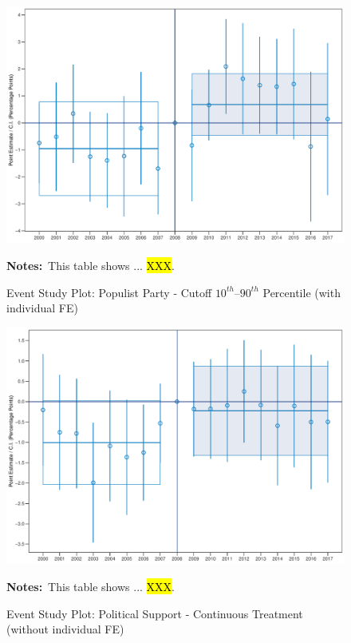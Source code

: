 \documentclass[11pt]{article}
\begin{document}
\begin{figure}[htbp!]
    \centering
    \caption{Event Study Plot: Populist Party - Cutoff $10^{th}$--$90^{th}$ Percentile (with individual FE)}\label{fig:dynamic_did_cbk_past_mean_pp_1090_ife}
    \includegraphics[width=1\linewidth]{events/dynamic_did_cbk_past_mean_pp_1090_ife}
    \begin{tablenotes}
        \footnotesize
        \item \textbf{Notes:}~This table shows ... \hl{XXX}.
    \end{tablenotes} 
\end{figure}

\begin{figure}[htbp!]
    \centering
    \caption{Event Study Plot: Political Support - Continuous Treatment (without individual FE)}\label{fig:dynamic_did_cbk_past_mean_ps_std_noife}
    \includegraphics[width=1\linewidth]{events/dynamic_did_cbk_past_mean_ps_std_noife}
    \begin{tablenotes}
        \footnotesize
        \item \textbf{Notes:}~This table shows ... \hl{XXX}.
    \end{tablenotes} 
\end{figure}
\end{document}
